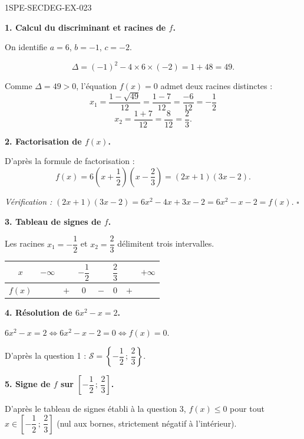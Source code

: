 \begin{corrige}{1SPE-SECDEG-EX-023}

\textbf{1. Calcul du discriminant et racines de $f$.}


On identifie $a = 6$, $b = -1$, $c = -2$.

\[\Delta = (-1)^2 - 4 \times 6 \times (-2) = 1 + 48 = 49.\]

Comme $\Delta = 49 > 0$, l'équation $f(x) = 0$ admet deux racines distinctes :
\[x_1 = \frac{1 - \sqrt{49}}{12} = \frac{1 - 7}{12} = \frac{-6}{12} = -\frac{1}{2}\]
\[x_2 = \frac{1 + 7}{12} = \frac{8}{12} = \frac{2}{3}.\]

\medskip
\textbf{2. Factorisation de $f(x)$.}


D'après la formule de factorisation :
\[f(x) = 6\left(x + \frac{1}{2}\right)\!\left(x - \frac{2}{3}\right) = (2x + 1)(3x - 2).\]

\textit{Vérification :} $(2x+1)(3x-2) = 6x^2 - 4x + 3x - 2 = 6x^2 - x - 2 = f(x)$. \hfill $\square$

\medskip
\textbf{3. Tableau de signes de $f$.}


Les racines $x_1 = -\dfrac{1}{2}$ et $x_2 = \dfrac{2}{3}$ délimitent trois intervalles.

\medskip
\begin{center}
\begin{tabular}{|c|ccccccc|}
\hline
$x$ & $-\infty$ & & $-\dfrac{1}{2}$ & & $\dfrac{2}{3}$ & & $+\infty$ \\
\hline
$f(x)$ & & $+$ & $0$ & $-$ & $0$ & $+$ & \\
\hline
\end{tabular}
\end{center}

\medskip
\textbf{4. Résolution de $6x^2 - x = 2$.}


$6x^2 - x = 2 \iff 6x^2 - x - 2 = 0 \iff f(x) = 0$.

D'après la question 1 : $\mathcal{S} = \left\{-\dfrac{1}{2}\,;\,\dfrac{2}{3}\right\}$.

\medskip
\textbf{5. Signe de $f$ sur $\left[-\dfrac{1}{2}\,;\,\dfrac{2}{3}\right]$.}


D'après le tableau de signes établi à la question 3, $f(x) \leqslant 0$ pour tout $x \in \left[-\dfrac{1}{2}\,;\,\dfrac{2}{3}\right]$ (nul aux bornes, strictement négatif à l'intérieur).

\end{corrige}
